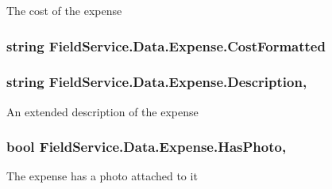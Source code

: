 The cost of the expense 

\hypertarget{class_field_service_1_1_data_1_1_expense_a220b3abc26e29c0adc432df6ba9ff993}{
\subsubsection[{Cost\+Formatted}]{\setlength{\rightskip}{0pt plus 5cm}string Field\+Service.\+Data.\+Expense.\+Cost\+Formatted\hspace{0.3cm}{\ttfamily [get]}}}\label{class_field_service_1_1_data_1_1_expense_a220b3abc26e29c0adc432df6ba9ff993}
\hypertarget{class_field_service_1_1_data_1_1_expense_acc079177bac1716caa5d28df4e453a6d}{
\subsubsection[{Description}]{\setlength{\rightskip}{0pt plus 5cm}string Field\+Service.\+Data.\+Expense.\+Description\hspace{0.3cm}{\ttfamily [get]}, {\ttfamily [set]}}}\label{class_field_service_1_1_data_1_1_expense_acc079177bac1716caa5d28df4e453a6d}


An extended description of the expense 

\hypertarget{class_field_service_1_1_data_1_1_expense_ab8f4a22623093af7fa54c2ac258a7eba}{
\subsubsection[{Has\+Photo}]{\setlength{\rightskip}{0pt plus 5cm}bool Field\+Service.\+Data.\+Expense.\+Has\+Photo\hspace{0.3cm}{\ttfamily [get]}, {\ttfamily [set]}}}\label{class_field_service_1_1_data_1_1_expense_ab8f4a22623093af7fa54c2ac258a7eba}


The expense has a photo attached to it 


